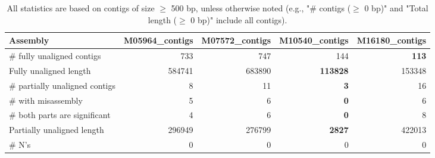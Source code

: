 \documentclass[12pt,a4paper]{article}
\begin{document}
\begin{table}[ht]
\begin{center}
\caption{All statistics are based on contigs of size $\geq$ 500 bp, unless otherwise noted (e.g., "\# contigs ($\geq$ 0 bp)" and "Total length ($\geq$ 0 bp)" include all contigs).}
\begin{tabular}{|l*{4}{|r}|}
\hline
Assembly & M05964\_contigs & M07572\_contigs & M10540\_contigs & M16180\_contigs \\ \hline
\# fully unaligned contigs & 733 & 747 & 144 & {\bf 113} \\ \hline
Fully unaligned length & 584741 & 683890 & {\bf 113828} & 153348 \\ \hline
\# partially unaligned contigs & 8 & 11 & {\bf 3} & 16 \\ \hline
\hspace{5mm}\# with misassembly & 5 & 6 & {\bf 0} & 6 \\ \hline
\hspace{5mm}\# both parts are significant & 4 & 6 & {\bf 0} & 8 \\ \hline
Partially unaligned length & 296949 & 276799 & {\bf 2827} & 422013 \\ \hline
\# N's & 0 & 0 & 0 & 0 \\ \hline
\end{tabular}
\end{center}
\end{table}
\end{document}

